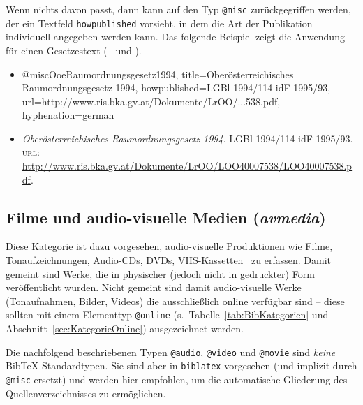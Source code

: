 Wenn nichts davon passt, dann kann auf den Typ \texttt{@misc} zurückgegriffen werden, der ein
Textfeld \texttt{howpublished} vorsieht, in dem die Art der Publikation individuell 
angegeben werden kann. Das folgende Beispiel zeigt die Anwendung für einen Gesetzestext 
(\sa\ \cite{FhStG1993} und \cite{EuRichtlinie2000}).
%
\begin{itemize}
\item[]
\begin{GenericCode}[numbers=none]
@misc{OoeRaumordnungsgesetz1994,
	title={Oberösterreichisches Raumordnungsgesetz 1994},
	howpublished={LGBl 1994/114 idF 1995/93},
	url={http://www.ris.bka.gv.at/Dokumente/LrOO/...538.pdf},
	hyphenation={german}
}
\end{GenericCode}
\item[\cite{OoeRaumordnungsgesetz1994}]
\textit{Oberösterreichisches Raumordnungsgesetz 1994}. LGBl 1994/114 idF
1995/93. \textsc{url}: \url{http://www.ris.bka.gv.at/Dokumente/LrOO/LOO40007538/LOO40007538.pdf}.
\end{itemize}
%



\subsection{Filme und audio-visuelle Medien (\emph{avmedia})}
\label{sec:KategorieAvmedia}

Diese Kategorie ist dazu vorgesehen, audio-visuelle Produktionen wie Filme, 
Tonaufzeichnungen, Audio-CDs, DVDs, VHS-Kassetten \usw\ zu erfassen.
Damit gemeint sind Werke, die in physischer (jedoch nicht in gedruckter) Form
veröffentlicht wurden.
Nicht gemeint sind damit audio-visuelle Werke (Tonaufnahmen, Bilder, Videos) 
die ausschließlich online verfügbar sind -- diese sollten mit einem Elementtyp 
\texttt{@online} (s.\ Tabelle~\ref{tab:BibKategorien} und Abschnitt~\ref{sec:KategorieOnline}) ausgezeichnet werden.

Die nachfolgend beschriebenen Typen \texttt{@audio}, \texttt{@video} und \texttt{@movie} 
sind \emph{keine} BibTeX-Standardtypen. Sie sind aber in \texttt{biblatex} vorgesehen
(und implizit durch \texttt{@misc} ersetzt) und werden hier empfohlen, um die automatische 
Gliederung des Quellenverzeichnisses zu ermöglichen.


